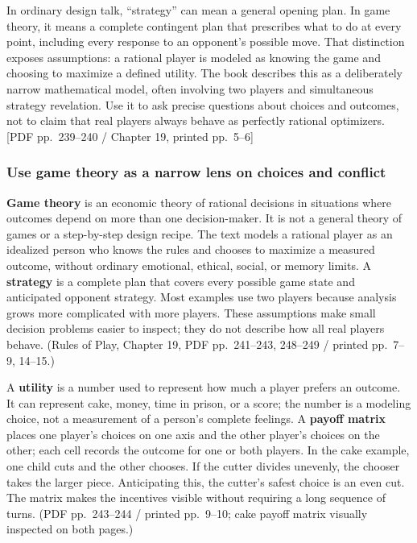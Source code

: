 In ordinary design talk, ``strategy'' can mean a general opening plan. In game theory, it means a complete contingent plan that prescribes what to do at every point, including every response to an opponent's possible move. That distinction exposes assumptions: a rational player is modeled as knowing the game and choosing to maximize a defined utility. The book describes this as a deliberately narrow mathematical model, often involving two players and simultaneous strategy revelation. Use it to ask precise questions about choices and outcomes, not to claim that real players always behave as perfectly rational optimizers. {[}PDF pp.~239--240 / Chapter 19, printed pp.~5--6{]}

\subsubsection{Use game theory as a narrow lens on choices and conflict}\label{05-engine-i-ch009-use-game-theory-as-a-narrow-lens-on-choices-and-conflict}

\hypertarget{05-engine-i-ch009-use-game-theory-as-a-narrow-lens-on-choices-and-conflict}{}

\textbf{Game theory} is an economic theory of rational decisions in situations where outcomes depend on more than one decision-maker. It is not a general theory of games or a step-by-step design recipe. The text models a rational player as an idealized person who knows the rules and chooses to maximize a measured outcome, without ordinary emotional, ethical, social, or memory limits. A \textbf{strategy} is a complete plan that covers every possible game state and anticipated opponent strategy. Most examples use two players because analysis grows more complicated with more players. These assumptions make small decision problems easier to inspect; they do not describe how all real players behave. (Rules of Play, Chapter 19, PDF pp.~241--243, 248--249 / printed pp.~7--9, 14--15.)

A \textbf{utility} is a number used to represent how much a player prefers an outcome. It can represent cake, money, time in prison, or a score; the number is a modeling choice, not a measurement of a person's complete feelings. A \textbf{payoff matrix} places one player's choices on one axis and the other player's choices on the other; each cell records the outcome for one or both players. In the cake example, one child cuts and the other chooses. If the cutter divides unevenly, the chooser takes the larger piece. Anticipating this, the cutter's safest choice is an even cut. The matrix makes the incentives visible without requiring a long sequence of turns. (PDF pp.~243--244 / printed pp.~9--10; cake payoff matrix visually inspected on both pages.)


